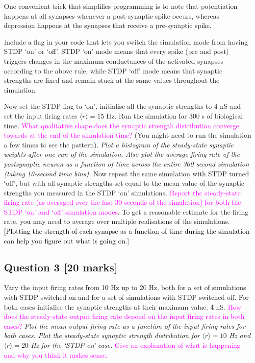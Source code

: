 \documentclass[12pt]{article}
\begin{document}
One convenient trick that simplifies programming is to note that potentiation happens at all synapses whenever a post-synaptic spike occurs, whereas depression happens at the synapses that receive a pre-synaptic spike.

Include a flag in your code that lets you switch the simulation mode
from having STDP `on' or `off'. STDP `on' mode means that every
spike (pre and post) triggers changes in the maximum conductances
of the activated synapses according to the above rule, while STDP
`off' mode means that synaptic strengths are fixed and remain stuck
at the same values throughout the simulation.


Now set the STDP flag to `on', initialise all the synaptic strengths to 4 nS and set the input firing rates $\langle r\rangle=15$
Hz. Run the simulation for 300 s of biological time. \textcolor{magenta}{What qualitative shape does the synaptic strength distribution converge towards at the end of the simulation time?} (You might need to run the simulation a few times to see the pattern).
\emph{Plot a histogram of the steady-state synaptic weights after
one run of the simulation. Also plot the average firing rate of the
postsynaptic neuron as a function of time across the entire
300 second simulation (taking 10-second time bins).}
Now repeat the same simulation with STDP turned `off', but with all synaptic strengths
set equal to the mean value of the synaptic strengths you measured
in the STDP `on' simulations. \textcolor{magenta}{Report the steady-state
firing rate (as averaged over the last 30 seconds of the simulation)
for both the STDP `on' and `off' simulation modes}. To get a reasonable
estimate for the firing rate, you may need to average over multiple
realisations of the simulations. \textcolor{black}{{[}Plotting the
 strength of each synapse as a function of time during the simulation
can help you figure out what is going on.{]}}

\subsection*{Question 3 [20 marks]} Vary the input firing rates from 10 Hz up to 20 Hz,
both for a set of simulations with STDP switched on and for a set
of simulations with STDP switched off. For both cases initialise the synaptic strengths at their maximum value, 4 nS. \textcolor{magenta}{How does
the steady-state output firing rate depend on the input firing rates
in both cases?} \emph{Plot the mean output firing rate as a function
of the input firing rates for both cases. Plot the steady-state synaptic strength
distribution for $\langle r\rangle=10$ Hz and $\langle r\rangle=20$
Hz for the `STDP on' case.} \textcolor{magenta}{Give an explanation of what is happening and why you think it makes sense.}
\end{document}
